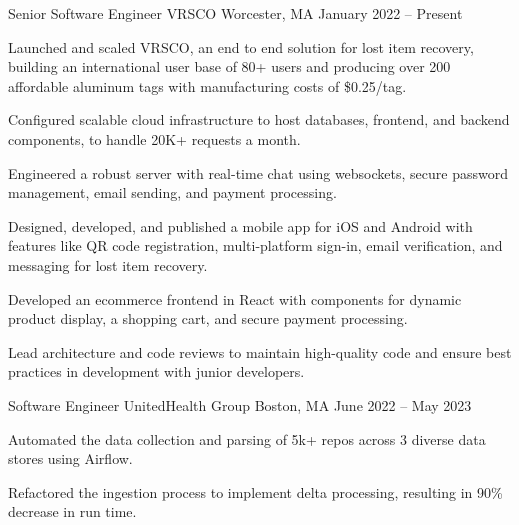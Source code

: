 

\begin{cventries}

  \cventry
    {Senior Software Engineer} %
    {VRSCO} %
    {Worcester, MA} %
    {January 2022 – Present}
    {
      \begin{cvitems} %
      \item {Launched and scaled VRSCO, an end to end solution for lost item recovery, building an international user base of 80+ users and producing over 200 affordable aluminum tags with manufacturing costs of \$0.25/tag.}
      \item {Configured scalable cloud infrastructure to host databases, frontend, and backend components, to handle 20K+ requests a month.}
      \item {Engineered a robust server with real-time chat using websockets, secure password management, email sending, and payment processing.}
      \item {Designed, developed, and published a mobile app for iOS and Android with features like QR code registration, multi-platform sign-in, email verification, and messaging for lost item recovery.}
      \item {Developed an ecommerce frontend in React with components for dynamic product display, a shopping cart, and secure payment processing.}
      \item {Lead architecture and code reviews to maintain high-quality code and ensure best practices in development with junior developers.}
      \end{cvitems}
    }
  \cventry
    {Software Engineer} %
    {UnitedHealth Group} %
    {Boston, MA} %
    {June 2022 – May 2023} %
    {
      \begin{cvitems} %
        \item {Automated the data collection and parsing of 5k+ repos across 3 diverse data stores using Airflow.}
        \item {Refactored the ingestion process to implement delta processing, resulting in 90\% decrease in run time.}

\end{cvitems}}
\end{cventries}
